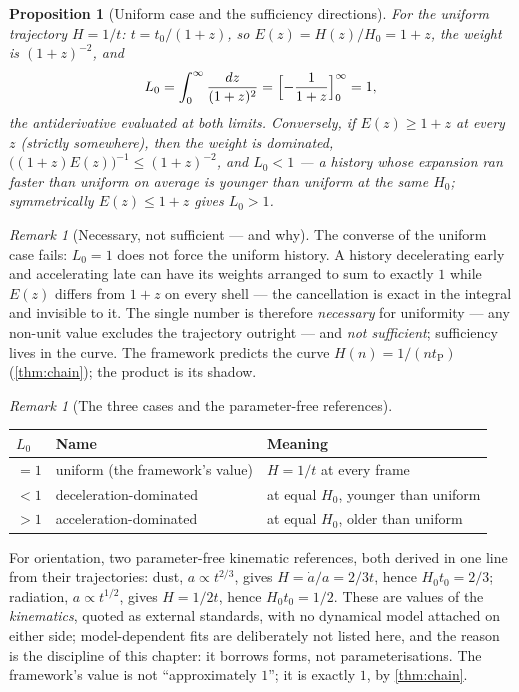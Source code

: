 \documentclass[11pt]{amsbook}
\theoremstyle{plain}
\newtheorem{proposition}[theorem]{Proposition}
\theoremstyle{definition}
\theoremstyle{remark}
\newtheorem{remark}[theorem]{Remark}
\newcommand{\uses}[1]{\par\nopagebreak\noindent{\footnotesize\emph{Uses: #1.}\par}}
\begin{document}
\begin{proposition}[Uniform case and the sufficiency directions]\label{prop:uniform-integral}
For the uniform trajectory $H = 1/t$: $t = t_{0}/(1+z)$, so $E(z) = H(z)/H_{0} = 1+z$, the weight is $(1+z)^{-2}$, and
\begin{equation}\label{eq:uniform-integral}
L_{0} = \int_{0}^{\infty}\frac{dz}{(1+z)^{2}} = \Bigl[-\frac{1}{1+z}\Bigr]_{0}^{\infty} = 1,
\end{equation}
the antiderivative evaluated at both limits. Conversely, \emph{if} $E(z) \geq 1+z$ at every $z$ (strictly somewhere), then the weight is dominated, $\bigl((1+z)E(z)\bigr)^{-1} \leq (1+z)^{-2}$, and $L_{0} < 1$ --- a history whose expansion ran faster than uniform on average is younger than uniform at the same $H_{0}$; symmetrically $E(z) \leq 1+z$ gives $L_{0} > 1$.
\uses{\cref{er:age-integral}, \cref{eq:hubblelaw}}
\end{proposition}

\begin{remark}[Necessary, not sufficient --- and why]\label{rem:necessary-not-sufficient}
The converse of the uniform case fails: $L_{0} = 1$ does not force the uniform history. A history decelerating early and accelerating late can have its weights arranged to sum to exactly $1$ while $E(z)$ differs from $1+z$ on every shell --- the cancellation is exact in the integral and invisible to it. The single number is therefore \emph{necessary} for uniformity --- any non-unit value excludes the trajectory outright --- and \emph{not sufficient}; sufficiency lives in the curve. The framework predicts the curve $H(n) = 1/(n t_{\mathrm P})$ (\cref{thm:chain}); the product is its shadow.
\end{remark}

\begin{remark}[The three cases and the parameter-free references]\label{rem:three-cases}
\begin{center}
\begin{tabular}{@{}lll@{}}
\toprule
$L_{0}$ & Name & Meaning \\
\midrule
$= 1$ & uniform (the framework's value) & $H = 1/t$ at every frame \\
$< 1$ & deceleration-dominated & at equal $H_{0}$, younger than uniform \\
$> 1$ & acceleration-dominated & at equal $H_{0}$, older than uniform \\
\bottomrule
\end{tabular}
\end{center}
For orientation, two parameter-free kinematic references, both derived in one line from their trajectories: dust, $a \propto t^{2/3}$, gives $H = \dot a/a = 2/3t$, hence $H_{0}t_{0} = 2/3$; radiation, $a \propto t^{1/2}$, gives $H = 1/2t$, hence $H_{0}t_{0} = 1/2$. These are values of the \emph{kinematics}, quoted as external standards, with no dynamical model attached on either side; model-dependent fits are deliberately not listed here, and the reason is the discipline of this chapter: it borrows forms, not parameterisations. The framework's value is not ``approximately $1$''; it is exactly $1$, by \cref{thm:chain}.
\end{remark}
\end{document}
